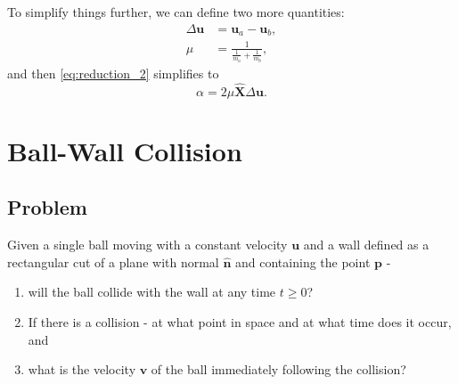 \documentclass{article}
\renewcommand{\vec}[1]{\bm{#1}}
\newcommand{\bhat}[1]{\bm{\hat{#1}}}
\begin{document}
\begin{enumerate}
        To simplify things further, we can define two more quantities:
        \begin{align}
            \Delta \vec{u} &= \vec{u}_{a}-\vec{u}_{b},\\
            \mu &= \frac{1}{\frac{1}{m_{a}}+\frac{1}{m_{b}}},
            \label{eq:simplifications_1}
        \end{align}
        and then \autoref{eq:reduction_2} simplifies to
        \begin{equation}
            \alpha = 2\mu\bhat{X}\Delta\vec{u}.
            \label{eq:simplifications_2}
        \end{equation}
\end{enumerate}

\section{Ball-Wall Collision}
\subsection{Problem}
Given a single ball moving with a constant velocity $\vec{u}$ and a wall defined as a rectangular cut of a plane with normal $\bhat{n}$ and containing the point $\vec{p}$ -

\begin{enumerate}
    \item will the ball collide with the wall at any time $t\geq0$?
    \item If there is a collision - at what point in space and at what time does it occur, and
    \item what is the velocity $\vec{v}$ of the ball immediately following the collision?
\end{enumerate}
\end{document}
